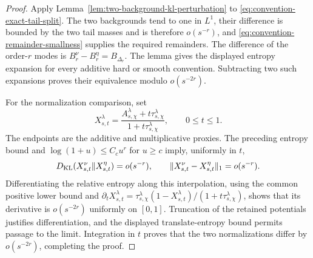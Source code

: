 \begin{proof}
Apply Lemma~\ref{lem:two-background-kl-perturbation} to
\eqref{eq:convention-exact-tail-split}.  The two backgrounds tend to one in
\(L^1\), their difference is bounded by the two tail masses and is therefore
\(o(s^{-r})\), and \eqref{eq:convention-remainder-smallness} supplies the
required remainders.  The difference of the order-\(r\) modes is
\(B_r^\nu-B_r^\eta=B_{\Delta_r}\).  The lemma gives the displayed entropy
expansion for every additive hard or smooth convention.  Subtracting two
such expansions proves their equivalence modulo \(o(s^{-2r})\).

For the normalization comparison, set
\[
 X_{s,t}^\lambda=
 \frac{A_{s,\chi}^\lambda+t\tau_{s,\chi}^\lambda}
      {1+t\tau_{s,\chi}^\lambda},\qquad 0\le t\le1.
\]
The endpoints are the additive and multiplicative proxies.  The preceding
entropy bound and \(\log(1+u)\le C_cu^r\) for \(u\ge c\) imply, uniformly in
\(t\),
\[
 D_{\rm KL}(X_{s,t}^\nu\|X_{s,t}^\eta)=o(s^{-r}),
 \qquad
 \|X_{s,t}^\nu-X_{s,t}^\eta\|_1=o(s^{-r}).
\]
Differentiating the relative entropy along this interpolation, using the
common positive lower bound and
\(\partial_tX_{s,t}^\lambda=
 \tau_{s,\chi}^\lambda(1-X_{s,t}^\lambda)/
 (1+t\tau_{s,\chi}^\lambda)\), shows that its derivative is
\(o(s^{-2r})\) uniformly on \([0,1]\).  Truncation of the retained
potentials justifies differentiation, and the displayed translate-entropy
bound permits passage to the limit.  Integration in \(t\) proves that the
two normalizations differ by \(o(s^{-2r})\), completing the proof.
\end{proof}
